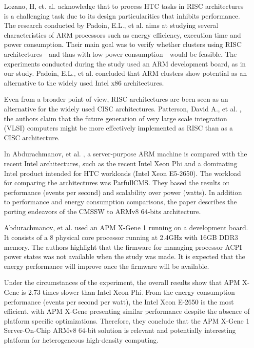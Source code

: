 Lozano, H, et. al. \cite{RISC_PERF} acknowledge that to process HTC tasks in RISC architectures is a challenging task due to its design particularities that inhibits performance. The research conducted by Padoin, E.L., et al.\cite{EVAL_ARM} aims at studying several characteristics of ARM processors such as energy efficiency, execution time and power consumption. Their main goal was to verify whether clusters using RISC architectures - and thus with low power consumption - would be feasible. The experiments conducted during the study used an ARM development board, as in our study. Padoin, E.L., et al. \cite{EVAL_ARM} concluded that ARM clusters show potential as an alternative to the widely used Intel x86 architectures.

Even from a broader point of view, RISC architectures are been seen as an alternative for the widely used CISC architectures. Patterson, David A., et al. \cite{RISC_CASE}, the authors claim that the future generation of very large scale integration (VLSI) computers might be more effectively implemented as RISC than as a CISC architecture.

In Abdurachmanov, et al. \cite{ACAT14ARMDAVID}, a server-purpose ARM machine is compared with the recent
Intel architectures, such as the recent Intel Xeon Phi and a dominating Intel product
intended for HTC workloads (Intel Xeon E5-2650). The workload for comparing
the architectures was ParfullCMS. They based the results on performance (events per
second) and scalability over power (watts). In addition to performance and energy
consumption comparisons, the paper describes the porting endeavors of the CMSSW to
ARMv8 64-bits architecture.

Abdurachmanov, et al. \cite{ACAT14ARMDAVID} used an APM X-Gene 1 running on a development board. 
It consists of a 8 physical core processor running at 2.4GHz with 16GB DDR3 memory.
The authors highlight that the firmware for managing processor ACPI power states was
not available when the study was made. It is expected that the energy 
performance will improve once the firmware will be available.

Under the circumstances of the experiment, the overall results show that APM X-Gene 
is 2.73 times slower than Intel Xeon Phi. From the energy consumption performance (events
per second per watt), the Intel Xeon E-2650 is the most efficient, with APM X-Gene
presenting similar performance despite the absence of platform specific 
optimizations. Therefore, they conclude that the APM
X-Gene 1 Server-On-Chip ARMv8 64-bit solution is relevant and potentially interesting
platform for heterogeneous high-density computing. 
 
